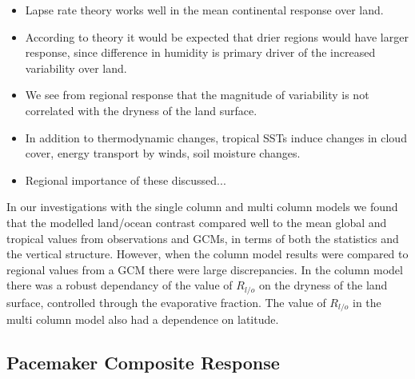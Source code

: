 \begin{itemize}
	\item Lapse rate theory works well in the mean continental response over 
		land.
	\item According to theory it would be expected that drier regions would have 
		larger response, since difference in humidity is primary driver of the 
		increased variability over land.
	\item We see from regional response that the magnitude of variability is not 
		correlated with the dryness of the land surface.
	\item In addition to thermodynamic changes, tropical SSTs induce changes in 
		cloud cover, energy transport by winds, soil moisture changes.
	\item Regional importance of these discussed...
\end{itemize}

In our investigations with the single column and multi column models we found 
that the modelled land/ocean contrast compared well to the mean global and 
tropical values from observations and GCMs, in terms of both the statistics and 
the vertical structure.  However, when the column model results were compared to 
regional values from a GCM there were large discrepancies. In the column model 
there was a robust dependancy of the value of $R_{l/o}$ on the dryness of the 
land surface, controlled through the evaporative fraction. The value of 
$R_{l/o}$ in the multi column model also had a dependence on latitude.  

\newpage

\subsection{Pacemaker Composite Response}

